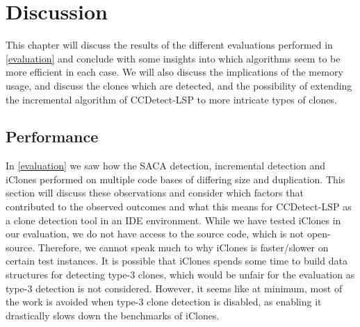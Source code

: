 \chapter{Discussion}

This chapter will discuss the results of the different evaluations performed in
\cref{evaluation} and conclude with some insights into which algorithms seem to be more
efficient in each case. We will also discuss the implications of the memory usage, and
discuss the clones which are detected, and the possibility of extending the incremental
algorithm of CCDetect-LSP to more intricate types of clones.

\section{Performance}

In \cref{evaluation} we saw how the SACA detection, incremental detection and iClones
performed on multiple code bases of differing size and duplication. This section will
discuss these observations and consider which factors that contributed to the observed
outcomes and what this means for CCDetect-LSP as a clone detection tool in an IDE
environment. While we have tested iClones in our evaluation, we do not have access to the
source code, which is not open-source. Therefore, we cannot speak much to why iClones is
faster/slower on certain test instances. It is possible that iClones spends some time to
build data structures for detecting type-3 clones, which would be unfair for the
evaluation as type-3 detection is not considered. However, it seems like at minimum, most
of the work is avoided when type-3 clone detection is disabled, as enabling it drastically
slows down the benchmarks of iClones.

